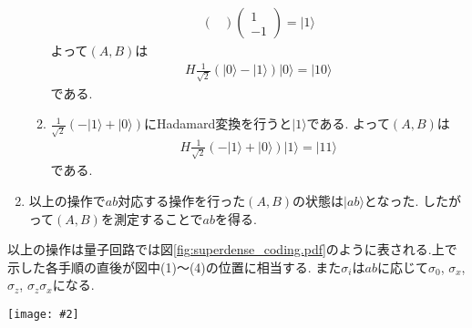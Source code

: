 \documentclass[uplatex,a4j,11pt,dvipdfmx]{jsarticle}
\makeatletter
\def\fgcaption{\def\@captype{figure}\caption}
\newcommand{\mfig}[3][width=15cm]{
\begin{center}
\texttt{[image: \#2]}
\fgcaption{#3 \label{fig:#2}}
\end{center}
}
\makeatother
\begin{document}
\begin{enumerate}
\begin{enumerate}
\begin{align}
\begin{pmatrix}
      \end{pmatrix}\begin{pmatrix}
        1\\-1
      \end{pmatrix}=|1\rangle
    \end{align}
    よって$(A,B)$は
    \begin{align}
      H\frac{1}{\sqrt{2}}(|0\rangle-|1\rangle)|0\rangle=|10\rangle
    \end{align}
    である.
    \item $\frac{1}{\sqrt{2}}(-|1\rangle+|0\rangle)$にHadamard変換を行うと$|1\rangle$である.
    よって$(A,B)$は
    \begin{align}
      H\frac{1}{\sqrt{2}}(-|1\rangle+|0\rangle)|1\rangle=|11\rangle
    \end{align}
    である.
  \end{enumerate}
  \item 以上の操作で$ab$対応する操作を行った$(A,B)$の状態は$|ab\rangle$となった.
  したがって$(A,B)$を測定することで$ab$を得る.
\end{enumerate}
以上の操作は量子回路では図\ref{fig:superdense_coding.pdf}のように表される.上で示した各手順の直後が図中(1)〜(4)の位置に相当する.
また$\sigma_i$は$ab$に応じて$\sigma_0$, $\sigma_x$, $\sigma_z$, $\sigma_z\sigma_x$になる.
\mfig[width=8cm]{superdense_coding.pdf}{超高密度符号化の量子回路, (1)〜(4)は上で示した各手順の後に相当する.}

\end{document}
